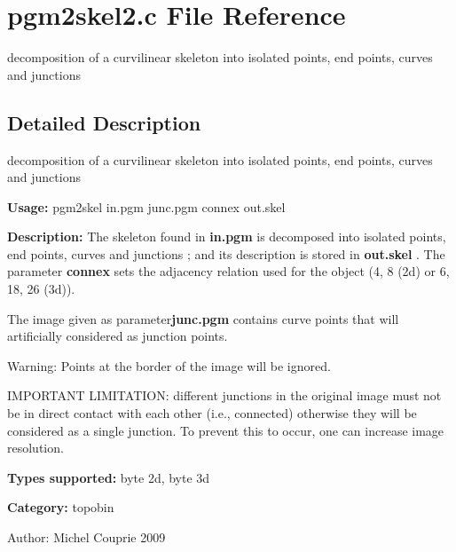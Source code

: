 \section{pgm2skel2.c File Reference}
\label{pgm2skel2_8c}
decomposition of a curvilinear skeleton into isolated points, end points, curves and junctions 



\subsection{Detailed Description}
decomposition of a curvilinear skeleton into isolated points, end points, curves and junctions 

{\bf Usage:} pgm2skel in.pgm junc.pgm connex out.skel

{\bf Description:} The skeleton found in {\bf in.pgm} is decomposed into isolated points, end points, curves and junctions ; and its description is stored in {\bf out.skel} . The parameter {\bf connex} sets the adjacency relation used for the object (4, 8 (2d) or 6, 18, 26 (3d)).

The image given as parameter{\bf junc.pgm} contains curve points that will artificially considered as junction points.

\begin{Desc}
\item[Warning:]Points at the border of the image will be ignored.

IMPORTANT LIMITATION: different junctions in the original image must not be in direct contact with each other (i.e., connected) otherwise they will be considered as a single junction. To prevent this to occur, one can increase image resolution.\end{Desc}
{\bf Types supported:} byte 2d, byte 3d

{\bf Category:} topobin

\begin{Desc}
\item[Author:]Michel Couprie 2009 \end{Desc}
